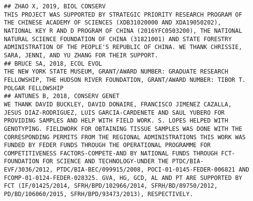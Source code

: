 \documentclass[]{article}
\begin{document}
\begin{verbatim}
## ZHAO X, 2019, BIOL CONSERV                                                                                                                                                                                                                                                                                                                                                                                                                                                                                                                                                                                                                                                                                                                            THIS PROJECT WAS SUPPORTED BY STRATEGIC PRIORITY RESEARCH PROGRAM OF THE CHINESE ACADEMY OF SCIENCES (XDB31020000 AND XDA19050202), NATIONAL KEY R AND D PROGRAM OF CHINA (2016YFC0503200), THE NATIONAL NATURAL SCIENCE FOUNDATION OF CHINA (31821001) AND STATE FORESTRY ADMINISTRATION OF THE PEOPLE'S REPUBLIC OF CHINA. WE THANK CHRISSIE, SARA, JENNI, AND YU ZHANG FOR THEIR SUPPORT.
## BRUCE SA, 2018, ECOL EVOL                                                                                                                                                                                                                                                                                                                                                                                                                                                                                                                                                                                                                                                                                                                                                                                                                                                                                                                                                                 THE NEW YORK STATE MUSEUM, GRANT/AWARD NUMBER: GRADUATE RESEARCH FELLOWSHIP, THE HUDSON RIVER FOUNDATION, GRANT/AWARD NUMBER: TIBOR T. POLGAR FELLOWSHIP
## ANTUNES B, 2018, CONSERV GENET                                                                                                                                                                                                                                                                                                               WE THANK DAVID BUCKLEY, DAVID DONAIRE, FRANCISCO JIMENEZ CAZALLA, JESUS DIAZ-RODRIGUEZ, LUIS GARCIA-CARDENETE AND SAUL YUBERO FOR PROVIDING SAMPLES AND HELP WITH FIELD WORK. S. LOPES HELPED WITH GENOTYPING. FIELDWORK FOR OBTAINING TISSUE SAMPLES WAS DONE WITH THE CORRESPONDING PERMITS FROM THE REGIONAL ADMINISTRATIONS THIS WORK WAS FUNDED BY FEDER FUNDS THROUGH THE OPERATIONAL PROGRAMME FOR COMPETITIVENESS FACTORS-COMPETE-AND BY NATIONAL FUNDS THROUGH FCT-FOUNDATION FOR SCIENCE AND TECHNOLOGY-UNDER THE PTDC/BIA-EVF/3036/2012, PTDC/BIA-BEC/099915/2008, POCI-01-0145-FEDER-006821 AND FCOMP-01-0124-FEDER-028325. GVA, HG, GCD, AL AND PT ARE SUPPORTED BY FCT (IF/01425/2014, SFRH/BPD/102966/2014, SFRH/BD/89750/2012, PD/BD/106060/2015, SFRH/BPD/93473/2013), RESPECTIVELY.

\end{verbatim}
\end{document}
